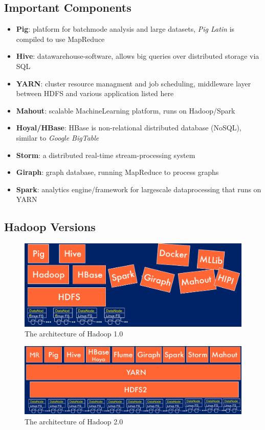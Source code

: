 \documentclass[a4paper]{article}
\begin{document}
\begin{multicols}{3}
\subsection{Important Components}
\begin{itemize}
    \item \textbf{Pig}: platform for batchmode analysis and large datasets, \textit{Pig Latin} is compiled to use MapReduce
    \item \textbf{Hive}: datawarehouse-software, allows big queries over distributed storage via SQL
    \item \textbf{YARN}: cluster resource managment and job scheduling, middleware layer between HDFS and various application listed here
    \item \textbf{Mahout}: scalable MachineLearning platform, runs on Hadoop/Spark
    \item \textbf{Hoyal/HBase}: HBase is non-relational distributed database (NoSQL), similar to \textit{Google BigTable}
    \item \textbf{Storm}: a distributed real-time stream-processing system
    \item \textbf{Giraph}: graph database, running MapReduce to process graphs
    \item \textbf{Spark}: analytics engine/framework for largescale dataprocessing that runs on YARN
\end{itemize}

\subsection{Hadoop Versions}
\begin{figure}[H]
    \includegraphics[width=\linewidth]{HadoopV1.png}
    \caption{The architecture of Hadoop 1.0}
    \label{fig:hadoopv1}
\end{figure}

\begin{figure}[H]
    \includegraphics[width=\linewidth]{HadoopV2.png}
    \caption{The architecture of Hadoop 2.0}
    \label{fig:hadoopv2}
\end{figure}


\end{multicols}
\end{document}

